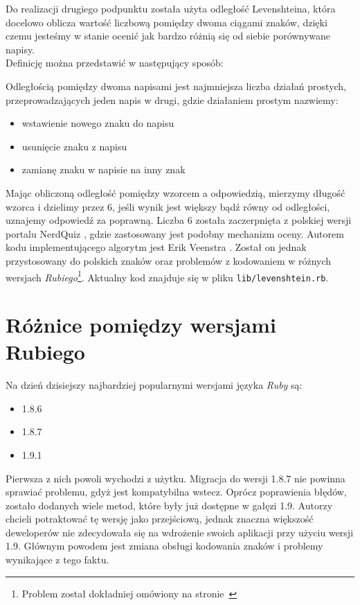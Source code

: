 \documentclass[12pt,twoside]{report}
\begin{document}
Do realizacji drugiego podpunktu została użyta odległość Levenshteina, która docelowo
oblicza wartość liczbową pomiędzy dwoma ciągami znaków, dzięki czemu jesteśmy w stanie
ocenić jak bardzo różnią się od siebie porównywane napisy.\\
Definicję można przedstawić w następujący sposób: \cite{levenshtein}


Odległością pomiędzy dwoma napisami jest najmniejsza liczba działań prostych,
przeprowadzających jeden napis w drugi, gdzie działaniem prostym nazwiemy:
\begin{itemize}
  \item wstawienie nowego znaku do napisu
  \item usunięcie znaku z napisu
  \item zamianę znaku w napisie na inny znak
\end{itemize}


Mając obliczoną odległość pomiędzy wzorcem a odpowiedzią, mierzymy długość wzorca i
dzielimy przez 6, jeśli wynik jest większy bądź równy od odległości, uznajemy odpowiedź
za poprawną. Liczba 6 została zaczerpnięta z polskiej wersji portalu NerdQuiz \cite{nerdquiz},
gdzie zastosowany jest podobny mechanizm oceny. Autorem kodu implementującego algorytm jest
Erik Veenstra \cite{veenstra}. Został on jednak przystosowany do polskich znaków oraz
problemów z kodowaniem w różnych wersjach \emph{Rubiego}\footnote{Problem został dokładniej
omówiony na stronie~\pageref{sec:ruby-versions}}. Aktualny kod znajduje się w pliku
\texttt{lib/levenshtein.rb}.

\section{Różnice pomiędzy wersjami Rubiego}\label{sec:ruby-versions}
Na dzień dzisiejszy najbardziej popularnymi wersjami języka \emph{Ruby} są:

\begin{itemize}
  \item{1.8.6}
  \item{1.8.7}
  \item{1.9.1}
\end{itemize}


Pierwsza z nich powoli wychodzi z użytku. Migracja do wersji 1.8.7 nie powinna sprawiać
problemu, gdyż jest kompatybilna wstecz. Oprócz poprawienia błędów, zostało dodanych wiele
metod, które były już dostępne w gałęzi 1.9. Autorzy chcieli potraktować tę wersję jako
przejściową, jednak znaczna większość deweloperów nie zdecydowała się na wdrożenie swoich
aplikacji przy użyciu wersji 1.9. Głównym powodem jest zmiana obsługi kodowania znaków i
problemy wynikające z tego faktu.
\end{document}
